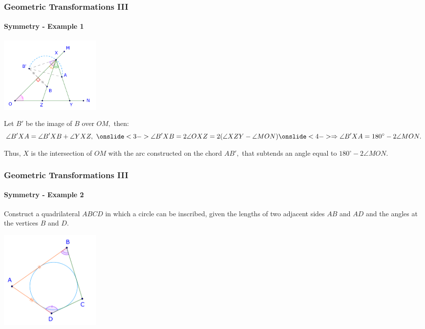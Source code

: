 \documentclass[8pt,xcolor=table,dvipsnames]{beamer}
\newcommand{\dg}{^\circ}
\begin{document}
\begin{frame}[t]
    \frametitle{Geometric Transformations III}
    \framesubtitle{Symmetry - Example 1}
    \begin{center}
        \includegraphics[width=5cm]{./svg/pdf/symmetry-1b.pdf}
    \end{center}
    Let $B'$ be the image of $B$ over $OM,$ then:
    \[
        \angle B'XA = \angle B'XB + \angle YXZ,\  \onslide<3->\angle B'XB = 2\angle OXZ = 2(\angle XZY - \angle MON)
        \onslide<4->\Rightarrow \angle B'XA = 180\dg - 2\angle MON.
    \]

    Thus, $X$ is the intersection of $OM$ with the arc constructed on the chord $AB',$ that subtends an angle equal to $180\dg - 2\angle MON.$
\end{frame}

\begin{frame}[t]
    \frametitle{Geometric Transformations III}
    \framesubtitle{Symmetry - Example 2}
    \begin{example}
        Construct a quadrilateral $ABCD$ in which a circle can be inscribed,
        given the lengths of two adjacent sides $AB$ and $AD$ and the angles at the vertices $B$ and $D.$
    \end{example}

    \begin{center}
        \includegraphics[width=5cm]{./svg/pdf/symmetry-2a.pdf}
    \end{center}
\end{frame}
\end{document}
